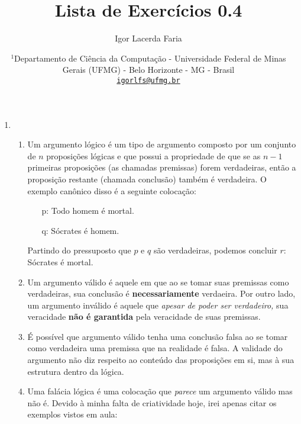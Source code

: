 \documentclass[leqno]{article} %
\author{Igor Lacerda Faria}
\begin{document}
\title{\textbf{Lista de Exercícios 0.4}}
\date{%
    \( ^1 \)Departamento de Ciência da Computação - Universidade Federal de Minas Gerais (UFMG) - Belo Horizonte - MG - Brasil \\ [3ex]
    \href{mailto:igorlfs@ufmg.br}{\nolinkurl{igorlfs@ufmg.br}}
}
\maketitle
\begin{enumerate}

    \item

        \begin{enumerate}

            \item Um argumento lógico é um tipo de argumento composto por um conjunto de \( n \) proposições lógicas e que possui a propriedade de que se as \( n - 1 \) primeiras proposições (as chamadas premissas) forem verdadeiras, então a proposição restante (chamada conclusão) também é verdadeira. O exemplo canônico disso é a seguinte colocação:

                \begin{itemize}

                    \item[p:] Todo homem é mortal.

                    \item[q:] Sócrates é homem.

                \end{itemize}

                Partindo do pressuposto que \( p \) e \( q \) são verdadeiras, podemos concluir \( r: \) Sócrates é mortal.

            \item Um argumento válido é aquele em que ao se tomar suas premissas como verdadeiras, sua conclusão é \textbf{necessariamente} verdaeira. Por outro lado, um argumento inválido é aquele que \textit{apesar de poder ser verdadeiro,} sua veracidade \textbf{não é garantida} pela veracidade de suas premissas.

            \item É possível que argumento válido tenha uma conclusão falsa ao se tomar como verdadeira uma premissa que na realidade é falsa. A validade do argumento não diz respeito ao conteúdo das proposições em si, mas à sua estrutura dentro da lógica.

            \item Uma falácia lógica é uma colocação que \textit{parece} um argumento válido mas não é. Devido à minha falta de criatividade hoje, irei apenas citar os exemplos vistos em aula: 


\end{enumerate}
\end{enumerate}
\end{document}
